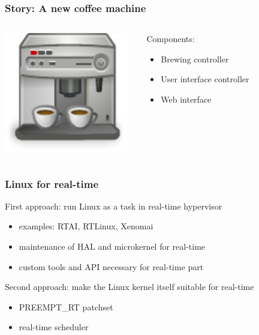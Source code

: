 \documentclass[aspectratio=1610,xcolor=svgnames]{beamer}
\begin{document}
\begin{frame}\frametitle{Story: A new coffee machine}
  \vspace{1cm}
  \begin{columns}
    \begin{column}{0.5\textwidth}
      \includegraphics[width=0.95\textwidth]{coffee.pdf}
    \end{column}
    \begin{column}{0.5\textwidth}
      {\Large Components:}
      \begin{itemize}
      \item Brewing controller
      \item User interface controller
      \item Web interface
      \end{itemize}
      \vspace{1cm}
    \end{column}
  \end{columns}
\end{frame}

\begin{frame}\frametitle{Linux for real-time}
  First approach: run Linux as a task in real-time hypervisor
  \begin{itemize}
  \item examples: RTAI, RTLinux, Xenomai
  \item maintenance of HAL and microkernel for real-time
  \item custom tools and API necessary for real-time part 
  \end{itemize}

  \pause

  Second approach: make the Linux kernel itself suitable for real-time
  \begin{itemize}
  \item PREEMPT\_RT patchset
  \item<3-> \alert{real-time scheduler}
  \end{itemize}
\end{frame}
\end{document}
